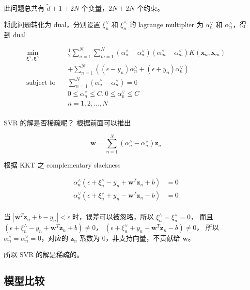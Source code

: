 \documentclass[a4paper]{article}
\begin{document}
此问题总共有 $\tilde{d} + 1 + 2N$ 个变量，$2N + 2N$ 个约束。

将此问题转化为 dual，分别设置 $\xi_n^{\vee}$ 和 $\xi_n^{\wedge}$ 的 lagrange multiplier 为
$\alpha_n^{\vee}$ 和 $\alpha_n^{\wedge}$，得到 dual

\begin{equation}
\begin{aligned}
\min_{\bm{\xi}^{\vee}, \bm{\xi}^{\wedge}} \quad & \frac{1}{2}\sum_{n=1}^{N}\sum_{m=1}^{N}(\alpha_n^{\wedge} - \alpha_n^{\vee})(\alpha_m^{\wedge} - \alpha_m^{\vee})K(\mathbf{x}_n, \mathbf{x}_m) \\
& + \sum_{n=1}^{N}((\epsilon - y_n)\alpha_n^{\wedge} + (\epsilon + y_n)\alpha_n^{\vee}) \\
\text{subject to} \quad & \sum_{n=1}^{N}(\alpha_n^{\wedge} - \alpha_n^{\vee}) = 0 \\
& 0 \le \alpha_n^{\wedge} \le C, 0 \le \alpha_n^{\vee} \le C \\
& n = 1, 2, \dots, N \\
\end{aligned}
\end{equation}

SVR 的解是否稀疏呢？
根据前面可以推出

$$\mathbf{w} = \sum_{n=1}^{N}(\alpha_n^{\wedge} - \alpha_n^{\vee})\mathbf{z}_n$$

根据 KKT 之 complementary slackness

\begin{equation}
\begin{aligned}
\alpha_n^{\wedge}(\epsilon + \xi_n^{\wedge} - y_n + \mathbf{w}^T\mathbf{z}_n + b) &= 0 \\
\alpha_n^{\vee}(\epsilon + \xi_n^{\vee} + y_n - \mathbf{w}^T\mathbf{z}_n - b) &= 0 \\
\end{aligned}
\end{equation}

当 $|\mathbf{w}^T\mathbf{z}_n + b - y_n| < \epsilon$ 时，误差可以被忽略，所以 $\xi_n^{\wedge} = \xi_n^{\vee} = 0$，
而且 $(\epsilon + \xi_n^{\wedge} - y_n + \mathbf{w}^T\mathbf{z}_n + b) \ne 0$，
$(\epsilon + \xi_n^{\vee} + y_n - \mathbf{w}^T\mathbf{z}_n - b) \ne 0$，
所以 $\alpha_n^{\wedge} = \alpha_n^{\vee} = 0$，对应的 $\mathbf{z}_n$ 系数为 0，非支持向量，不贡献给 $\mathbf{w}$。

所以 SVR 的解是稀疏的。


\subsection{模型比较}
\end{document}
